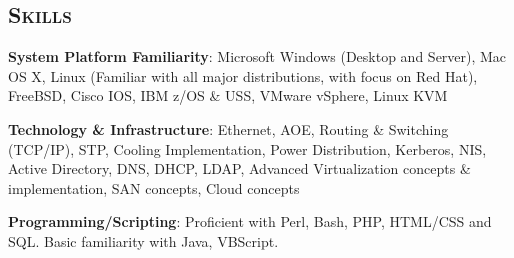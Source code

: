 \begin{resume}

\section{\textsc{Skills}}

\textbf{System Platform Familiarity}: Microsoft Windows (Desktop and Server), Mac OS X, Linux (Familiar with all major distributions, with focus on Red Hat), FreeBSD, Cisco IOS, IBM z/OS \& USS, VMware vSphere, Linux KVM

\textbf{Technology \& Infrastructure}: Ethernet, AOE, Routing \& Switching (TCP/IP), STP, Cooling Implementation, Power Distribution, Kerberos, NIS, Active Directory, DNS, DHCP, LDAP, Advanced Virtualization concepts \& implementation, SAN concepts, Cloud concepts

\textbf{Programming/Scripting}: Proficient with Perl, Bash, PHP, HTML/CSS and SQL. Basic familiarity with Java, VBScript.










\end{resume}

